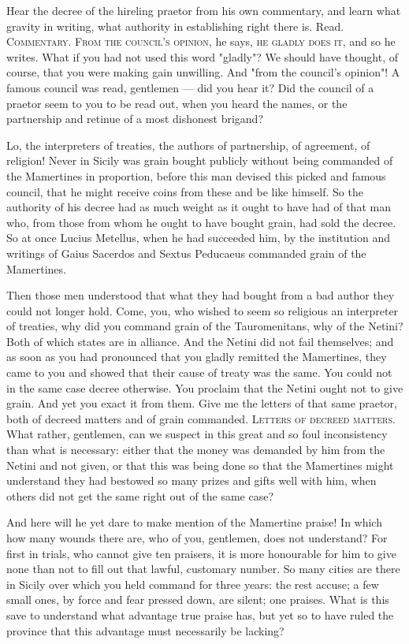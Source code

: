  Hear the decree of the hireling praetor from his own commentary, and learn what gravity in writing, what authority in establishing right there is. Read. \textsc{Commentary}. \textsc{From the council's opinion}, he says, \textsc{he gladly does it}, and so he writes. What if you had not used this word "gladly"? We should have thought, of course, that you were making gain unwilling. And "from the council's opinion"! A famous council was read, gentlemen --- did you hear it? Did the council of a praetor seem to you to be read out, when you heard the names, or the partnership and retinue of a most dishonest brigand?

 Lo, the interpreters of treaties, the authors of partnership, of agreement, of religion! Never in Sicily was grain bought publicly without being commanded of the Mamertines in proportion, before this man devised this picked and famous council, that he might receive coins from these and be like himself. So the authority of his decree had as much weight as it ought to have had of that man who, from those from whom he ought to have bought grain, had sold the decree. So at once Lucius Metellus, when he had succeeded him, by the institution and writings of Gaius Sacerdos and Sextus Peducaeus commanded grain of the Mamertines.

 Then those men understood that what they had bought from a bad author they could not longer hold. Come, you, who wished to seem so religious an interpreter of treaties, why did you command grain of the Tauromenitans, why of the Netini? Both of which states are in alliance. And the Netini did not fail themselves; and as soon as you had pronounced that you gladly remitted the Mamertines, they came to you and showed that their cause of treaty was the same. You could not in the same case decree otherwise. You proclaim that the Netini ought not to give grain. And yet you exact it from them. Give me the letters of that same praetor, both of decreed matters and of grain commanded. \textsc{Letters of decreed matters}. What rather, gentlemen, can we suspect in this great and so foul inconsistency than what is necessary: either that the money was demanded by him from the Netini and not given, or that this was being done so that the Mamertines might understand they had bestowed so many prizes and gifts well with him, when others did not get the same right out of the same case?

 And here will he yet dare to make mention of the Mamertine praise! In which how many wounds there are, who of you, gentlemen, does not understand? For first in trials, who cannot give ten praisers, it is more honourable for him to give none than not to fill out that lawful, customary number. So many cities are there in Sicily over which you held command for three years: the rest accuse; a few small ones, by force and fear pressed down, are silent; one praises. What is this save to understand what advantage true praise has, but yet so to have ruled the province that this advantage must necessarily be lacking?

